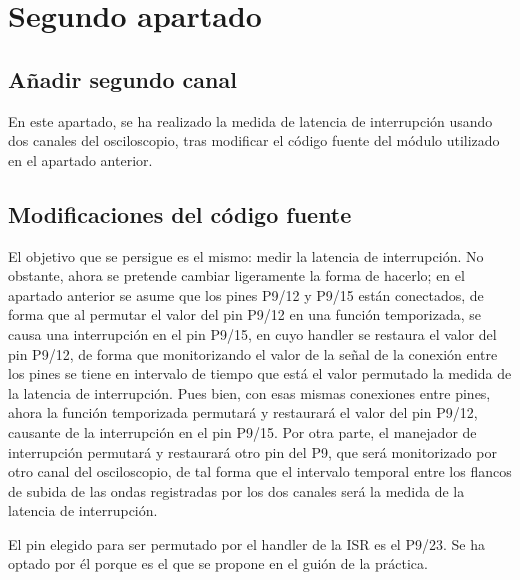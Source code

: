 \documentclass[../main.tex]{subfiles}
\begin{document}
\section{Segundo apartado}

\subsection{Añadir segundo canal}

En este apartado, se ha realizado la medida de latencia de interrupción usando dos canales del osciloscopio, tras modificar el código fuente del módulo utilizado en el apartado anterior.

\subsection{Modificaciones del código fuente}

El objetivo que se persigue es el mismo: medir la latencia de interrupción. No obstante, ahora se pretende cambiar ligeramente la forma de hacerlo; en el apartado anterior se asume que los pines P9/12 y P9/15 están conectados, de forma que al permutar el valor del pin P9/12 en una función temporizada, se causa una interrupción en el pin P9/15, en cuyo handler se restaura el valor del pin P9/12, de forma que monitorizando el valor de la señal de la conexión entre los pines se tiene en intervalo de tiempo que está el valor permutado la medida de la latencia de interrupción. Pues bien, con esas mismas conexiones entre pines, ahora la función temporizada permutará y restaurará el valor del pin P9/12, causante de la interrupción en el pin P9/15. Por otra parte, el manejador de interrupción permutará y restaurará otro pin del P9, que será monitorizado por otro canal del osciloscopio, de tal forma que el intervalo temporal entre los flancos de subida de las ondas registradas por los dos canales será la medida de la latencia de interrupción.

El pin elegido para ser permutado por el handler de la ISR es el P9/23. Se ha optado por él porque es el que se propone en el guión de la práctica. 
\end{document}
